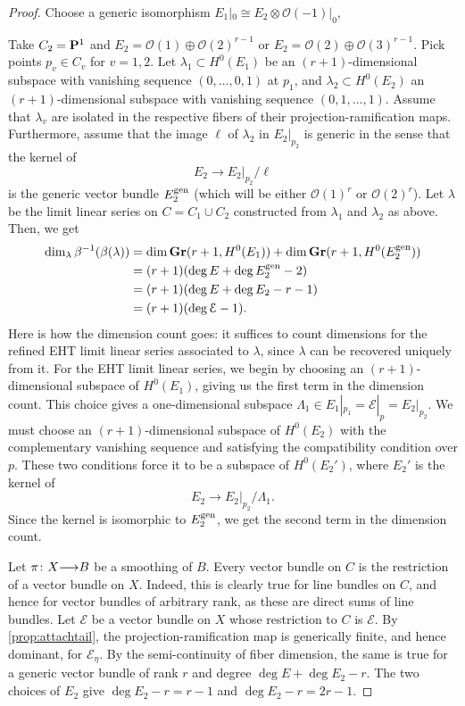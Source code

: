 \documentclass[11pt,reqno]{amsart}
\theoremstyle{plain}
\theoremstyle{definition}
\theoremstyle{remark}
\numberwithin{equation}{section}
\renewcommand{\to}{{\longrightarrow}}
\numberwithin{equation}{section}
\renewcommand{\O}{\mathcal O}
\begin{document}
\begin{proof}
  
  Choose a generic isomorphism $E_1|_0 \cong E_2 \otimes \O(-1)|_0$, 
  
  
  Take $C_2 = \P^1$ and $E_2 = \O(1)\oplus\O(2)^{r-1}$ or $E_2 = \O(2) \oplus \O(3)^{r-1}$.
  Pick points $p_v \in C_v$ for $v = 1, 2$.
  Let $\lambda_1 \subset H^0(E_1)$ be an $(r+1)$-dimensional subspace with vanishing sequence $(0, \dots, 0, 1)$ at $p_1$, and $\lambda_2 \subset H^0(E_2)$ an $(r+1)$-dimensional subspace with vanishing sequence $(0, 1, \dots, 1)$.
  Assume that $\lambda_v$ are isolated in the respective fibers of their projection-ramification maps.
  Furthermore, assume that the image $\ell$ of $\lambda_2$ in $E_2|_{p_2}$ is generic in the sense that the kernel of
  \[ E_2 \to E_2|_{p_2}/ \ell \]
  is the generic vector bundle $E_2^{\rm gen}$ (which will be either $\O(1)^r$ or $\O(2)^r$).
  Let $\lambda$ be the limit linear series on $C = C_1 \cup C_2$ constructed from $\lambda_1$ and $\lambda_2$ as above.
  Then, we get
  \begin{align*}
    \dim_\lambda \beta^{-1}(\beta(\lambda)) &= \dim \Gr(r+1, H^0(E_1)) + \dim \Gr(r+1, H^0(E_2^{\rm gen}))\\
                                            &= (r+1)(\deg E + \deg E_2^{\rm gen}-2) \\
                                            &= (r+1)(\deg E + \deg E_2 - r - 1) \\
                                            &= (r+1)(\deg \mathcal E - 1).
  \end{align*}
  Here is how the dimension count goes: it suffices to count dimensions for the refined EHT limit linear series associated to $\lambda$, since $\lambda$ can be recovered uniquely from it.
  For the EHT limit linear series, we begin by choosing an $(r+1)$-dimensional subspace of $H^0(E_1)$, giving us the first term in the dimension count.
  This choice gives a one-dimensional subspace $\Lambda_1 \in E_1|_{p_1} = \mathcal E|_p = E_2|_{p_2}$.
  We must choose an $(r+1)$-dimensional subspace of $H^0(E_2)$ with the complementary vanishing sequence and satisfying the compatibility condition over $p$.
  These two conditions force it to be a subspace of $H^0(E_2')$, where $E_2'$ is the kernel of
  \[E_2 \to E_2|_{p_2}/\Lambda_1.\]
  Since the kernel is isomorphic to $E_2^{\rm gen}$, we get the second term in the dimension count.
  
  Let $\pi \from X \to B$ be a smoothing of $B$.
  Every vector bundle on $C$ is the restriction of a vector bundle on $X$.
  Indeed, this is clearly true for line bundles on $C$, and hence for vector bundles of arbitrary rank, as these are direct sums of line bundles. 
  Let $\mathscr E$ be a vector bundle on $X$ whose restriction to $C$ is $\mathcal E$.
  By \autoref{prop:attachtail}, the projection-ramification map is generically finite, and hence dominant, for $\mathcal E_\eta$.
  By the semi-continuity of fiber dimension, the same is true for a generic vector bundle of rank $r$ and degree $\deg E + \deg E_2 - r $.
  The two choices of $E_2$ give $\deg E_2 - r = r-1$ and $\deg E_2 - r = 2r-1$.


\end{proof}
\end{document}
